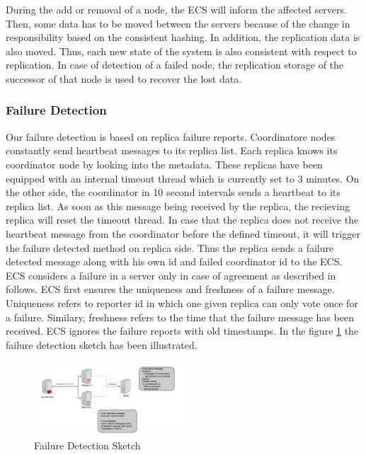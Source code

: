 \documentclass{sig-alternate}
\begin{document}
During the add or removal of a node, the ECS will inform the affected servers. Then, some data has to be moved between the servers because of the change in responsibility based on the consistent hashing. In addition, the replication data is also moved. Thus, each new state of the system is also consistent with respect to replication. In case of detection of a failed node, the replication storage of the successor of that node is used to recover the lost data. 
\subsubsection{Failure Detection}
Our failure detection is based on replica failure reports. Coordinatore nodes 
constantly send heartbeat messages to its replica list. Each replica knows its coordinator node by looking into the metadata. These replicas have been equipped with an internal timeout thread which is currently set to 3 minutes. On the other side, the coordinator in 10 second intervals sends a heartbeat to its replica list. As soon as this message being received by the replica, the recieving replica will reset the timeout thread. In case that the replica does not receive the heartbeat message from the coordinator before the defined timeout, it will trigger the failure detected method on replica side. Thus the replica sends a failure detected message along with his own id and failed coordinator id to the ECS. 
ECS considers a failure in a server only in case of agreement as described in follows. ECS first ensures the uniqueness and freshness of a failure message. Uniqueness refers to reporter id in which one given replica can only vote once for a failure. Similary, freshness refers to the time that the failure message has been received. ECS ignores the failure reports with old timestamps.
In the figure \ref{failuredetection} the failure detection sketch has been illustrated.


\begin{center}
\begin{figure}[ht!]
\centering
     \includegraphics[width=0.5\textwidth]{FailureDetection.jpg}
\caption{Failure Detection Sketch \label{failuredetection}}
\end{figure}
\end{center}
\end{document}
